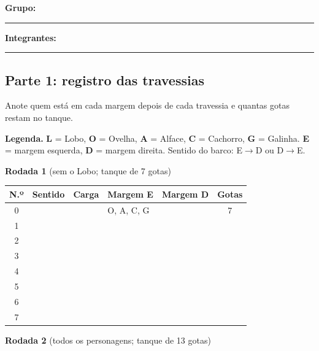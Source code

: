 \documentclass[12pt,a4paper]{article}
\begin{document}
\noindent\textbf{Grupo:} \rule[-2pt]{3cm}{0.4pt}

\smallskip
\noindent\textbf{Integrantes:} \rule[-2pt]{\dimexpr\linewidth-3.2cm\relax}{0.4pt}

\subsection*{Parte 1: registro das travessias}

Anote quem está em cada margem depois de cada travessia e quantas gotas restam
no tanque.

\begin{tcolorbox}[colback=gray!8,colframe=gray!60,boxrule=0.6pt,arc=1.5mm,
  left=2mm,right=2mm,top=1mm,bottom=1mm,fontupper=\small\setstretch{1.1}]
\textbf{Legenda.} \textbf{L} = Lobo, \textbf{O} = Ovelha, \textbf{A} = Alface,
\textbf{C} = Cachorro, \textbf{G} = Galinha. \textbf{E} = margem esquerda,
\textbf{D} = margem direita. Sentido do barco: E$\rightarrow$D ou
D$\rightarrow$E.
\end{tcolorbox}

\smallskip
\noindent\textbf{Rodada 1} (sem o Lobo; tanque de 7 gotas)

\begin{singlespace}
\begingroup\centering
\renewcommand{\arraystretch}{1.25}
\small
\begin{tabular}{|c|c|p{2.3cm}|p{3.3cm}|p{3.3cm}|c|}
\hline
\textbf{N.º} & \textbf{Sentido} & \textbf{Carga} & \textbf{Margem E} & \textbf{Margem D} & \textbf{Gotas} \\
\hline
0 & & & O, A, C, G & & 7 \\ \hline
1 & & & & & \\ \hline
2 & & & & & \\ \hline
3 & & & & & \\ \hline
4 & & & & & \\ \hline
5 & & & & & \\ \hline
6 & & & & & \\ \hline
7 & & & & & \\ \hline
\end{tabular}
\par\endgroup
\end{singlespace}

\smallskip
\noindent\textbf{Rodada 2} (todos os personagens; tanque de 13 gotas)
\end{document}
